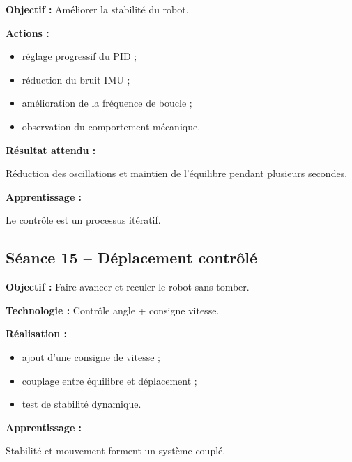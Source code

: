 \documentclass[11pt,a4paper]{article}
\begin{document}
	\begin{sessionbox}
		
		\textbf{Objectif :} Améliorer la stabilité du robot.
		
		\vspace{0.3cm}
		
		\textbf{Actions :}
		
		\begin{itemize}
			\item réglage progressif du PID ;
			\item réduction du bruit IMU ;
			\item amélioration de la fréquence de boucle ;
			\item observation du comportement mécanique.
		\end{itemize}
		
		\vspace{0.3cm}
		
		\textbf{Résultat attendu :}
		
		Réduction des oscillations et maintien de l'équilibre pendant plusieurs secondes.
		
		\vspace{0.3cm}
		
		\textbf{Apprentissage :}
		
		Le contrôle est un processus itératif.
		
	\end{sessionbox}
	
	\subsection*{Séance 15 -- Déplacement contrôlé}
	
	\begin{sessionbox}
		
		\textbf{Objectif :} Faire avancer et reculer le robot sans tomber.
		
		\vspace{0.3cm}
		
		\textbf{Technologie :} Contrôle angle + consigne vitesse.
		
		\vspace{0.3cm}
		
		\textbf{Réalisation :}
		
		\begin{itemize}
			\item ajout d'une consigne de vitesse ;
			\item couplage entre équilibre et déplacement ;
			\item test de stabilité dynamique.
		\end{itemize}
		
		\vspace{0.3cm}
		
		\textbf{Apprentissage :}
		
		Stabilité et mouvement forment un système couplé.
		
	\end{sessionbox}
	
\end{document}
